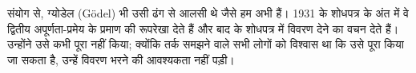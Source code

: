 \documentclass[../../../include/open-logic-section]{subfiles}
\begin{document}
\begin{digress}
संयोग से, ग्योडेल (G\"odel) भी उसी ढंग से आलसी थे जैसे हम अभी हैं। 1931 के शोधपत्र
के अंत में वे द्वितीय अपूर्णता-प्रमेय के प्रमाण की रूपरेखा देते हैं और बाद
के शोधपत्र में विवरण देने का वचन देते हैं। उन्होंने उसे कभी पूरा नहीं किया;
क्योंकि तर्क समझने वाले सभी लोगों को विश्वास था कि उसे पूरा किया जा सकता
है, उन्हें विवरण भरने की आवश्यकता नहीं पड़ी।
\end{digress}
\end{document}
